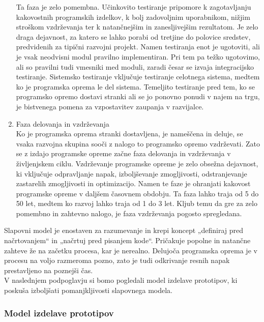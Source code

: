 \documentclass[a4paper,12pt,openright]{book}
\begin{document}
\begin{enumerate}
     Ta faza je zelo pomembna. Učinkovito testiranje pripomore k zagotavljanju kakovostnih programskih izdelkov, k bolj zadovoljnim uporabnikom, nižjim stroškom vzdrževanja ter k natančnejšim in zanesljivejšim rezultatom. Je zelo draga dejavnost, za katero se lahko porabi od tretjine do polovice sredstev, predvidenih za tipični razvojni projekt.
Namen testiranja enot je ugotoviti, ali je vsak neodvisni modul pravilno implementiran. Pri tem pa težko ugotovimo, ali so pravilni tudi vmesniki med moduli, zaradi česar se izvaja integracijsko testiranje. Sistemsko testiranje vključuje testiranje celotnega sistema, medtem ko je programska oprema le del sistema. Temeljito testiranje pred tem, ko se programsko opremo dostavi stranki ali se jo ponovno ponudi v najem na trgu, je bistvenega pomena za vzpostavitev zaupanja v razvijalce.
    \item Faza delovanja in vzdrževanja \\
    Ko je programska oprema stranki dostavljena, je nameščena in deluje, se vsaka razvojna skupina sooči z nalogo to programsko opremo vzdrževati. Zato se z izdajo programske opreme začne faza delovanja in vzdrževanja v življenjskem ciklu. Vzdrževanje programske opreme je zelo obsežna dejavnost, ki vključuje odpravljanje napak, izboljševanje zmogljivosti, odstranjevanje zastarelih zmogljivosti in optimizacijo. Namen te faze je ohranjati kakovost programske opreme v daljšem časovnem obdobju. Ta faza lahko traja od 5 do 50 let, medtem ko razvoj lahko traja od 1 do 3 let.  Kljub temu da gre za zelo pomembno in zahtevno nalogo, je faza vzdrževanja pogosto spregledana.
\end{enumerate}
Slapovni model je enostaven za razumevanje in krepi koncept „definiraj pred načrtovanjem“ in „načrtuj pred pisanjem kode“. Pričakuje popolne in natančne zahteve že na začetku procesa, kar je nerealno. Delujoča programska oprema je v procesu na voljo razmeroma pozno, zato je tudi odkrivanje resnih napak prestavljeno na poznejši čas. \cite{aggarwal2005software, alshamrani2015comparison} \\
V naslednjem podpoglavju si bomo pogledali model izdelave prototipov, ki poskuša izboljšati pomanjkljivosti slapovnega modela.


\pagebreak
\subsubsection{Model izdelave prototipov}
\end{document}
